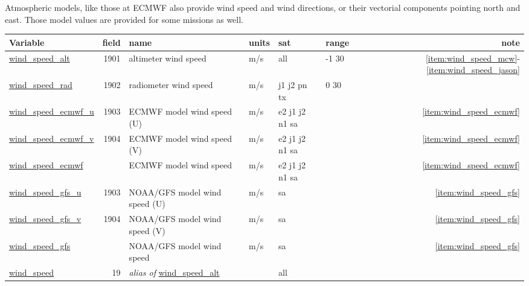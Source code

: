 \documentclass[a4paper,11pt,openany,natbib]{thesis}
\makeatletter
\newcommand\var[1]{\url{#1}\index{variables!#1@\protect\url{#1}}}
\newcommand\alias[1]{\emph{alias of} \var{#1}}
\newenvironment{vartable}{
\begin{table}[ht]
\small
\begin{tabular}{lrllllr}
\hline
Variable & field & name & units & sat & range & note \\
\hline
}{
\hline
\end{tabular}
\end{table}
}
\makeatother
\begin{document}
Atmospheric models, like those at ECMWF also provide wind speed and wind directions, or their vectorial components pointing north and east. Those model values are provided for some missions as well.

\begin{vartable}
\var{wind_speed_alt} & 1901 & altimeter wind speed & m/s & all & -1 30 & \ref{item:wind_speed_mcw}-\ref{item:wind_speed_jason} \\
\var{wind_speed_rad} & 1902 & radiometer wind speed & m/s & j1 j2 pn tx & 0 30 & \\
\var{wind_speed_ecmwf_u} & 1903 & ECMWF model wind speed (U) & m/s & e2 j1 j2 n1 sa & & \ref{item:wind_speed_ecmwf} \\
\var{wind_speed_ecmwf_v} & 1904 & ECMWF model wind speed (V) & m/s & e2 j1 j2 n1 sa & & \ref{item:wind_speed_ecmwf} \\
\var{wind_speed_ecmwf} & & ECMWF model wind speed & m/s & e2 j1 j2 n1 sa & & \ref{item:wind_speed_ecmwf} \\
\var{wind_speed_gfs_u} & 1903 & NOAA/GFS model wind speed (U) & m/s & sa & & \ref{item:wind_speed_gfs} \\
\var{wind_speed_gfs_v} & 1904 & NOAA/GFS model wind speed (V) & m/s & sa & & \ref{item:wind_speed_gfs} \\
\var{wind_speed_gfs} & & NOAA/GFS model wind speed & m/s & sa & & \ref{item:wind_speed_gfs} \\
\hline
\var{wind_speed} & 19 & \alias{wind_speed_alt} && all && \\
\end{vartable}
\end{document}
